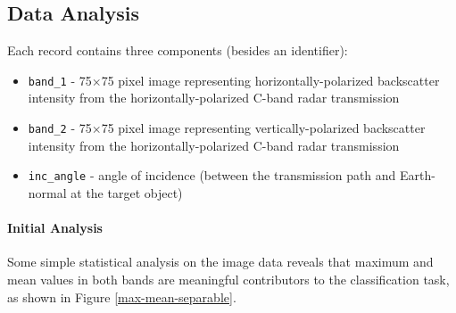 \documentclass[fleqn,10pt]{SelfArx} %
\begin{document}
\subsection{Data Analysis}
Each record contains three components (besides an identifier):

\begin{itemize}
	\item \texttt{band\_1} - 75$\times$75 pixel image representing horizontally-polarized backscatter intensity from the horizontally-polarized C-band radar transmission
	\item \texttt{band\_2} - 75$\times$75 pixel image representing vertically-polarized backscatter intensity from the horizontally-polarized C-band radar transmission
	\item \texttt{inc\_angle} - angle of incidence (between the transmission path and Earth-normal at the target object)
\end{itemize}

\paragraph{Initial Analysis} Some simple statistical analysis on the image data reveals that maximum and mean values in both bands are meaningful contributors to the classification task, as shown in Figure \ref{max-mean-separable}.
\end{document}
